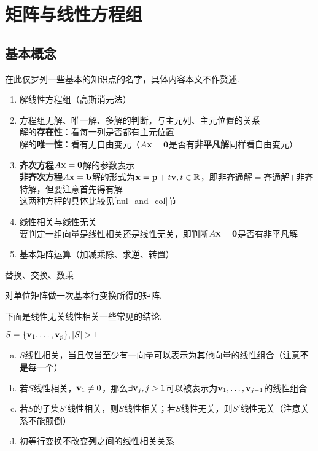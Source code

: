 
\section{矩阵与线性方程组}
\subsection{基本概念}
在此仅罗列一些基本的知识点的名字，具体内容本文不作赘述.
\begin{enumerate}
	\itemsep -3pt
	\item 解线性方程组（高斯消元法）
	\item 方程组无解、唯一解、多解的判断，与主元列、主元位置的关系\\
		解的\textbf{存在性}：看每一列是否都有主元位置\\
		解的\textbf{唯一性}：看有无自由变元（$A\mathbf{x}=\mathbf{0}$是否有\textbf{非平凡解}同样看自由变元）
	\item \textbf{齐次方程}$A\mathbf{x}=\mathbf{0}$解的参数表示\\
		\textbf{非齐次方程}$A\mathbf{x}=\mathbf{b}$解的形式为$\mathbf{x}=\mathbf{p}+t\mathbf{v},t\in\mathbb{R}$，即非齐通解$=$齐通解$+$非齐特解，但要注意首先得有解\\
		这两种方程的具体比较见\ref{nul_and_col}节
	\item 线性相关与线性无关\\
	要判定一组向量是线性相关还是线性无关，即判断$A\mathbf{x}=\mathbf{0}$是否有非平凡解
	\item 基本矩阵运算（加减乘除、求逆、转置）
\end{enumerate}
\begin{definition}
替换、交换、数乘
\end{definition}
\begin{definition}[初等(elementary)矩阵]
对单位矩阵做一次基本行变换所得的矩阵.
\end{definition}
\par 下面是线性无关线性相关一些常见的结论.
\begin{theorem}
\label{linear_relationship}
$S=\{\vb{v}_1,\dots,\vb{v}_p\},|S|>1$
\begin{enumerate}[(a)]
	\itemsep -3pt
	\item $S$线性相关，当且仅当至少有一向量可以表示为其他向量的线性组合（注意\textbf{不是}每一个）
	\item 若$S$线性相关，$\mathbf{v}_1\ne 0$，那么$\exists\mathbf{v}_j,j>1$可以被表示为$\mathbf{v}_1,\dots,\mathbf{v}_{j-1}$的线性组合
	\item 若$S$的子集$S'$线性相关，则$S$线性相关；若$S$线性无关，则$S'$线性无关（注意关系不能颠倒）
	\item 初等行变换不改变\textbf{列}之间的线性相关关系
\end{enumerate}
\end{theorem}
